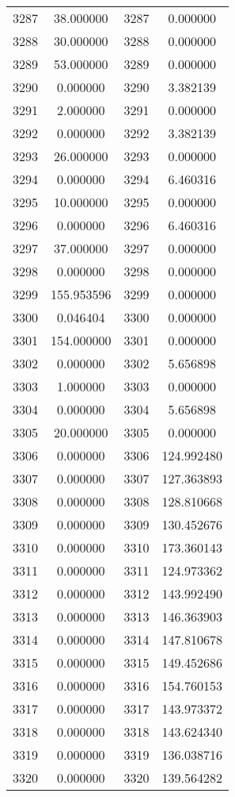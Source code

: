 \documentclass[12pt]{article}
\begin{document}
\begin{longtable}{@{}cccc@{}}
3287 & 38.000000 & 3287 & 0.000000 \\
3288 & 30.000000 & 3288 & 0.000000 \\
3289 & 53.000000 & 3289 & 0.000000 \\
3290 & 0.000000 & 3290 & 3.382139 \\
3291 & 2.000000 & 3291 & 0.000000 \\
3292 & 0.000000 & 3292 & 3.382139 \\
3293 & 26.000000 & 3293 & 0.000000 \\
3294 & 0.000000 & 3294 & 6.460316 \\
3295 & 10.000000 & 3295 & 0.000000 \\
3296 & 0.000000 & 3296 & 6.460316 \\
3297 & 37.000000 & 3297 & 0.000000 \\
3298 & 0.000000 & 3298 & 0.000000 \\
3299 & 155.953596 & 3299 & 0.000000 \\
3300 & 0.046404 & 3300 & 0.000000 \\
3301 & 154.000000 & 3301 & 0.000000 \\
3302 & 0.000000 & 3302 & 5.656898 \\
3303 & 1.000000 & 3303 & 0.000000 \\
3304 & 0.000000 & 3304 & 5.656898 \\
3305 & 20.000000 & 3305 & 0.000000 \\
3306 & 0.000000 & 3306 & 124.992480 \\
3307 & 0.000000 & 3307 & 127.363893 \\
3308 & 0.000000 & 3308 & 128.810668 \\
3309 & 0.000000 & 3309 & 130.452676 \\
3310 & 0.000000 & 3310 & 173.360143 \\
3311 & 0.000000 & 3311 & 124.973362 \\
3312 & 0.000000 & 3312 & 143.992490 \\
3313 & 0.000000 & 3313 & 146.363903 \\
3314 & 0.000000 & 3314 & 147.810678 \\
3315 & 0.000000 & 3315 & 149.452686 \\
3316 & 0.000000 & 3316 & 154.760153 \\
3317 & 0.000000 & 3317 & 143.973372 \\
3318 & 0.000000 & 3318 & 143.624340 \\
3319 & 0.000000 & 3319 & 136.038716 \\
3320 & 0.000000 & 3320 & 139.564282 \\

\end{longtable}
\end{document}
